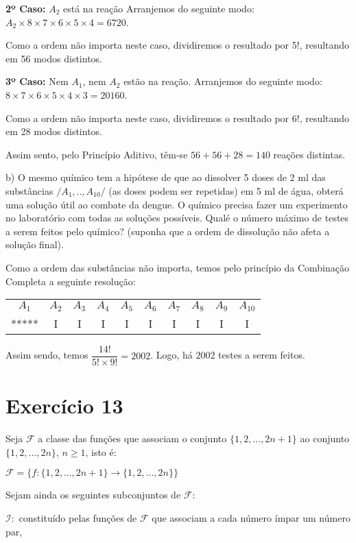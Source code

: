 \documentclass[12pt]{article}
\begin{document}
\textbf{2º Caso:} $A_2$ está na reação
Arranjemos do seguinte modo:
$A_2 \times 8 \times 7 \times 6 \times 5 \times 4 = 6720$.

Como a ordem não importa neste caso, dividiremos o resultado por 5!, resultando em 56 modos distintos.

\textbf{3º Caso:} Nem $A_1$, nem $A_2$ estão na reação. Arranjemos do seguinte modo:
$8 \times 7 \times 6 \times 5 \times 4 \times 3 = 20160$.

Como a ordem não importa neste caso, dividiremos o resultado por 6!, resultando em 28 modos distintos.

Assim sento, pelo Princípio Aditivo, têm-se $56 + 56 + 28 = 140$ reações distintas.

b) O mesmo químico tem a hipótese de que ao dissolver 5 doses de 2 ml das substâncias $/{A_1, .., A_10/}$ (as doses podem ser repetidas) em 5 ml de água, obterá uma solução útil ao combate da dengue. O químico precisa fazer um experimento no laboratório com todas as soluções possíveis. Qualé o número máximo de testes a serem feitos pelo químico? (suponha que a ordem de dissolução não afeta a solução final).

Como a ordem das substâncias não importa, temos pelo princípio da Combinação Completa a seguinte resolução:

\begin{tabular}{cccccccccc}
	$A_1$ & $A_2$ & $A_3$ & $A_4$ & $A_5$ & $A_6$ & $A_7$ & $A_8$ & $A_9$ & $A_10$ \\ 
	***** & I & I & I & I & I & I & I & I & I \\ 
\end{tabular}  
       
Assim sendo, temos $\displaystyle \dfrac{14!}{5! \times 9!} = 2002$. Logo, há 2002 testes a serem feitos.

\section*{Exercício 13}

Seja $\mathcal{F}$ a classe das funções que associam o conjunto $\{1, 2, ..., 2n+1\}$ ao conjunto $\{1,2, ... , 2n\}$, $n \geq 1$, isto é:

$\mathcal{F} = \{ f: \{1, 2, ...,2n+1 \} \rightarrow \{1, 2, ..., 2n \} \}$

Sejam ainda os seguintes subconjuntos de $\mathcal{F}$:

$\mathcal{I}:$ constituído pelas funções de $\mathcal{F}$ que associam a cada número ímpar um número par,
\end{document}
